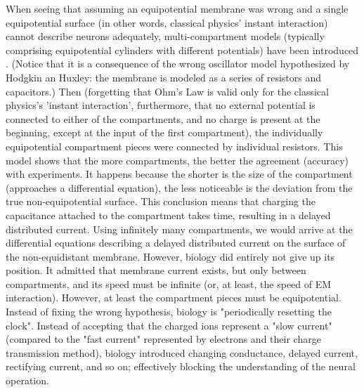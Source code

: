 {When seeing that assuming an equipotential membrane was wrong and
a single equipotential surface (in other words, classical physics' instant
interaction) cannot describe neurons adequately, multi-compartment
models (typically comprising equipotential cylinders with different
potentials) have been introduced \cite{MathNeuroscience:2010}. (Notice that it is a consequence of the wrong oscillator model hypothesized by Hodgkin an Huxley: the membrane is modeled as a series of resistors and capacitors.) Then
(forgetting that Ohm's Law is valid only for the classical physics's 'instant
interaction', furthermore, that no external potential is connected
to either of the compartments, and no charge is present at the beginning,
except at the input of the first compartment), the individually
equipotential
compartment pieces were connected by individual resistors. This model shows that
the more compartments,
the better the agreement (accuracy) with experiments.
It happens because the shorter is the size of the compartment
(approaches a differential equation), the less noticeable is the deviation
from the true non-equipotential surface. This conclusion means that
charging the capacitance attached to the compartment takes time, resulting
in a delayed distributed current. Using infinitely many
compartments, we would arrive at the differential equations describing
a delayed distributed current on the surface of the non-equidistant
membrane. However, biology did entirely not give up its position.
It admitted that membrane current exists, but only between compartments,
and its speed must be infinite (or, at least, the speed of 
 \gls{EM}
interaction). However, at least the compartment pieces must be equipotential.
Instead of fixing the wrong hypothesis, biology is "periodically
resetting the clock". Instead of accepting that the charged ions
represent a "slow current" (compared to the "fast current" represented by electrons and their charge transmission method), biology introduced changing conductance, delayed current, rectifying current, and so on; effectively blocking
the understanding of the neural operation.
}


